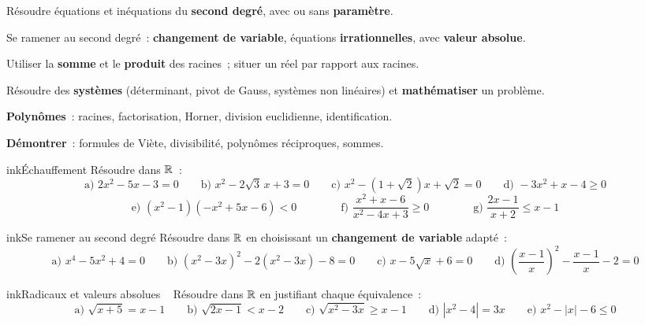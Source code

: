 \def\piedfiche{TD n°1 · 1ère S1}



\begin{competences}
  \item Résoudre équations et inéquations du \textbf{second degré}, avec ou sans \textbf{paramètre}.
  \item Se ramener au second degré~: \textbf{changement de variable}, équations \textbf{irrationnelles}, avec \textbf{valeur absolue}.
  \item Utiliser la \textbf{somme} et le \textbf{produit} des racines~; situer un réel par rapport aux racines.
  \item Résoudre des \textbf{systèmes} (déterminant, pivot de Gauss, systèmes non linéaires) et \textbf{mathématiser} un problème.
  \item \textbf{Polynômes}~: racines, factorisation, Horner, division euclidienne, identification.
  \item \textbf{Démontrer}~: formules de Viète, divisibilité, polynômes réciproques, sommes.
\end{competences}


\begin{exo}{ink}{Échauffement }
Résoudre dans $\mathbb{R}$~:
\[
\text{a) } 2x^2-5x-3=0 \qquad \text{b) } x^2-2\sqrt3\,x+3=0 \qquad \text{c) } x^2-(1+\sqrt2)x+\sqrt2=0 \qquad \text{d) } -3x^2+x-4\geq0
\]
\[
\text{e) } (x^2-1)(-x^2+5x-6)<0 \qquad\qquad \text{f) } \frac{x^2+x-6}{x^2-4x+3}\geq 0 \qquad\qquad \text{g) } \frac{2x-1}{x+2}\leq x-1
\]
\end{exo}

\begin{exo}{ink}{Se ramener au second degré }
Résoudre dans $\mathbb{R}$ en choisissant un \textbf{changement de variable} adapté~:
\[
\text{a) } x^4-5x^2+4=0 \qquad \text{b) } (x^2-3x)^2-2(x^2-3x)-8=0 \qquad \text{c) } x-5\sqrt x+6=0 \qquad \text{d) } \left(\frac{x-1}{x}\right)^2-\frac{x-1}{x}-2=0
\]
\end{exo}

\begin{exo}{ink}{Radicaux et valeurs absolues \ \demo}
Résoudre dans $\mathbb{R}$ en justifiant chaque équivalence~:
\[
\text{a) } \sqrt{x+5}=x-1 \qquad \text{b) } \sqrt{2x-1}<x-2 \qquad \text{c) } \sqrt{x^2-3x}\geq x-1 \qquad \text{d) } |x^2-4|=3x \qquad \text{e) } x^2-|x|-6\leq 0
\]
\end{exo}

